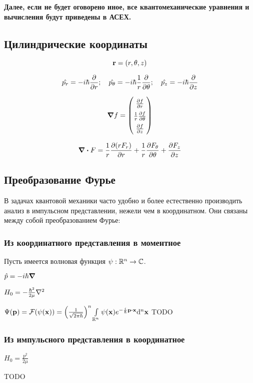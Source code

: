 \textbf{Далее, если не будет оговорено иное, все квантомеханические уравнения и вычисления будут приведены в АСЕХ.}

\subsection{Цилиндрические координаты}

\[
\vb{r} = (r, \theta, z)
\]

\[
\hat {p_r} = - i \hbar \pdv{r};\quad 
\hat{p_\theta} = - i \hbar \frac{1}{r} \pdv{\theta};\quad 
\hat{p_z} = - i \hbar \pdv{z}
\]

$$\renewcommand\arraystretch{1.5}
\gradient f = 
\begin{pmatrix}
\pdv{f}{r} \\
\frac{1}{r} \pdv{f}{\theta}  \\
\pdv{f}{z} 
\end{pmatrix}
$$


$$
\divergence F =
\frac{1}{r} \pdv{(r F_r)}{r}
+ \frac{1}{r} \pdv{F_\theta}{\theta}
+ \pdv{F_z}{z}
$$


\subsection{Преобразование Фурье}
В задачах квантовой механики часто удобно и более естественно производить анализ в импульсном представлении, нежели чем в координатном. Они связаны между собой преобразованием Фурье:

\subsubsection{Из координатного представления в моментное}
Пусть имеется волновая функция $\psi: \mathbb{R}^n \to \mathbb{C}$. 

$\hat{p} = -i \hbar \grad$

$H_0 = - \frac{\hbar^2}{2 \mu} \laplacian$

$\Psi(\vb{p}) = \mcF(\psi(\vb{x})) = \left(\frac{1}{\sqrt{2 \pi \hbar}}\right)^n \int\limits_{\bbR^n} \psi(\vb{x}) e^{-\frac{i}{\hbar} \vb{p} \vdot \vb{x}} \dd^n \vb{x}$
TODO

\subsubsection{Из импульсного представления в координатное}

$H_0 = \frac{p^2}{2 \mu}$

TODO

